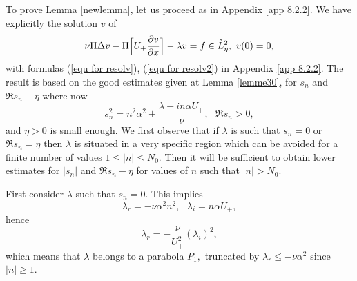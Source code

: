\documentclass[11pt]{article}
\begin{document}




To prove Lemma \ref{newlemma}, let us proceed as in Appendix
\ref{app 8.2.2}. We have explicitly the solution $v$ of 
\begin{equation*}
\nu \Pi \Delta v- \Pi \Bigl[ U_+\frac{\partial v}{\partial x } \Bigr]
-\lambda v=f\in \mathring{L}_{\eta}^{2},\text{ }v(0)=0,
\end{equation*}%
with formulas (\ref{equ for resolv}), (\ref{equ for resolv2}) in Appendix \ref{app 8.2.2}. The
result is based on the good estimates given at Lemma \ref{lemme30}, for $%
s_{n}$ and $\Re s_{n}-\eta $ where now
\begin{equation*}
s_{n}^{2}=n^{2}\alpha ^{2}+\frac{\lambda -i n \alpha U_+ }{\nu },\text{ }\Re
s_{n}>0,
\end{equation*}%
and $\eta >0$ is small enough. We first observe that if $\lambda $ is such that $%
s_{n}=0$ or $\Re s_{n}=\eta $ then $\lambda $ is situated in a very specific
region which can be avoided for a finite number of values $1\leq |n|\leq
N_{0}.$ Then it will be sufficient to obtain lower estimates for $|s_{n}|$
and $\Re s_{n}-\eta $ for values of $n$ such that $|n|>N_{0}.$

First consider $\lambda $ such that $s_{n}=0.$ This implies%
\begin{equation*}
\lambda _{r}=-\nu \alpha ^{2}n^{2},\text{ }\lambda _{i}=n\alpha U_+ ,
\end{equation*}%
hence%
\begin{equation}
\lambda _{r}=-\frac{\nu }{U_+^{2}}(\lambda _{i})^{2},
\label{parabolaP1}
\end{equation}%
which means that $\lambda $ belongs to a parabola $P_{1},$ truncated by $%
\lambda _{r}\leq -\nu \alpha ^{2}$ since $|n|\geq 1.$
\end{document}
